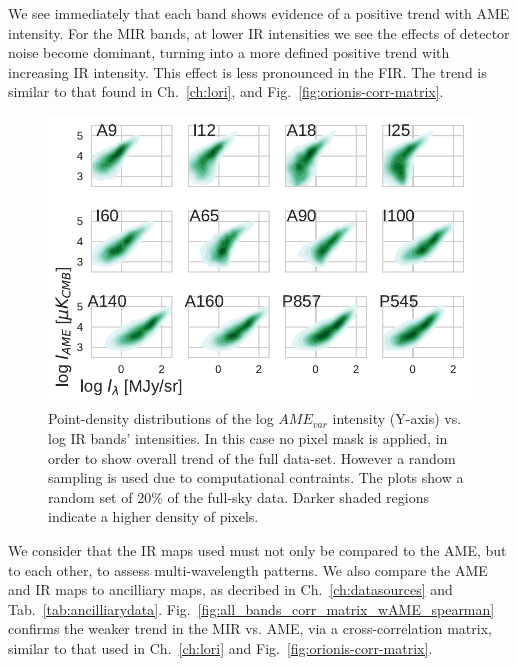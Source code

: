         We see immediately that each band shows evidence of a positive trend with AME intensity. For the MIR bands, at lower IR intensities we see the effects of detector noise become dominant, turning into a more defined positive trend with increasing IR intensity. This effect is less pronounced in the FIR. The trend is similar to that found in Ch.~\ref{ch:lori}, and Fig.~\ref{fig:orionis-corr-matrix}.
          \begin{figure}
            \includegraphics[width=\textwidth]{../Plots/ch_allsky/AMEvsDust_allsky_allbands_mpsub_kde_unmasked.pdf}
            \centering
            \caption{Point-density distributions of the log $AME_{var}$ intensity (Y-axis) vs. log IR bands' intensities. In this case no pixel mask is applied, in order to show overall trend of the full data-set. However a random sampling is used due to computational contraints. The plots show a random set of 20\% of the full-sky data. Darker shaded regions indicate a higher density of pixels.}
            \label{fig:AMEvsDust_allsky_allbands_mpsub_kde_unmasked}
          \end{figure}
        We consider that the IR maps used must not only be compared to the AME, but to each other, to assess multi-wavelength patterns. We also compare the AME and IR maps to ancilliary maps, as decribed in Ch.~\ref{ch:datasources} and Tab.~\ref{tab:ancilliarydata}. Fig.~\ref{fig:all_bands_corr_matrix_wAME_spearman} confirms the weaker trend in the MIR vs. AME, via a cross-correlation matrix, similar to that used in Ch.~\ref{ch:lori} and Fig.~\ref{fig:orionis-corr-matrix}.
